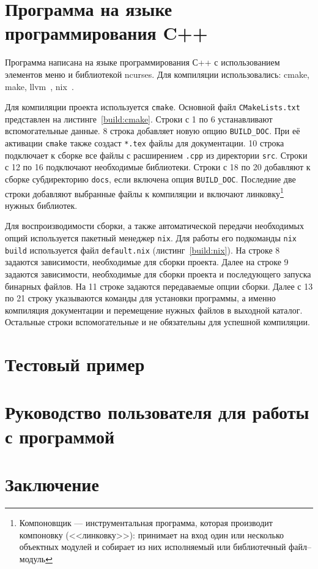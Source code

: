 \documentclass[12pt,chapterprefix=true,headings=onelineappendix]{scrartcl}
\begin{document}
\newpage{}
\section{Программа на языке программирования C++}

Программа написана на языке программирования С++ с использованием
элементов меню и библиотекой ncurses\cite{ПроектGNU1993-ncurses}. Для
компиляции использовались: cmake\cite{Kitware2000-cmake}, make,
llvm~\cite{LLVMFoundation2024}, nix~\cite{Долстра2003}.

Для компиляции проекта используется \verb|cmake|. Основной файл
\verb|CMakeLists.txt| представлен на листинге~\ref{build:cmake}. Строки с 1 по
6 устанавливают вспомогательные данные. 8 строка добавляет новую опцию
\verb|BUILD_DOC|. При её активации \verb|cmake| также создаст \verb|*.tex|
файлы для документации. 10 строка подключает к сборке все файлы с расширением
\verb|.cpp| из директории \verb|src|. Строки с 12 по 16 подключают необходимые
библиотеки. Строки с 18 по 20 добавляют к сборке субдиректорию \verb|docs|,
если включена опция \verb|BUILD_DOC|. Последние две строки добавляют выбранные
файлы к компиляции и включают линковку\footnote{Компоновщик ---
	инструментальная программа, которая производит компоновку (<<линковку>>):
	принимает на вход один или несколько объектных модулей и собирает из них
	исполняемый или библиотечный файл--модуль} нужных библиотек.


Для воспроизводимости сборки, а также автоматической передачи необходимых опций
используется пакетный менеджер \verb|nix|. Для работы его подкоманды \verb|nix build|
используется файл \verb|default.nix| (листинг~\ref{build:nix}). На строке 8
задаются зависимости, необходимые для сборки проекта. Далее на строке 9
задаются зависимости, необходимые для сборки проекта и последующего запуска
бинарных файлов. На 11 строке задаются передаваемые опции сборки. Далее с 13 по
21 строку указываются команды для установки программы, а именно компиляция
документации и перемещение нужных файлов в выходной каталог. Остальные строки
вспомогательные и не обязательны для успешной компиляции.


\newpage{}
\section{Тестовый пример}

\newpage{}
\section{Руководство пользователя для работы с программой}
\newpage{}

\section*{Заключение}

\newpage
\nocite{*}
\printbibliography[heading=bibintoc]
\end{document}

